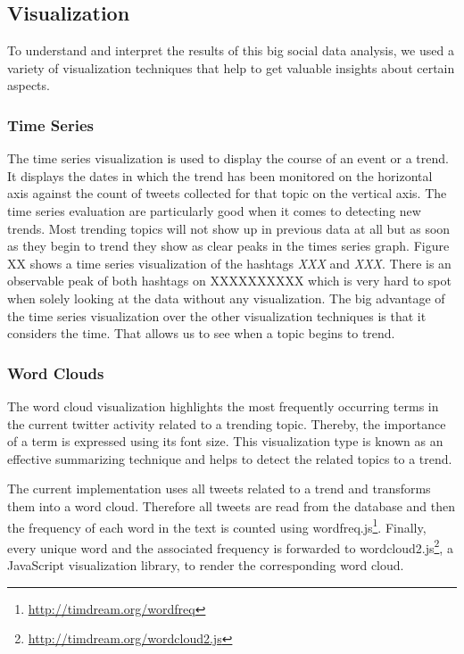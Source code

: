 \subsection{Visualization}
\label{subsec:visualization}
To understand and interpret the results of this big social data analysis, we used a variety of visualization techniques that help to get valuable insights about certain aspects.

\subsubsection{Time Series}
\label{subsubsec:vis-time-series}
The time series visualization is used to display the course of an event or a trend. It displays the dates in which the trend has been monitored on the horizontal axis against the count of tweets collected for that topic on the vertical axis. The time series evaluation are particularly good when it comes to detecting new trends. Most trending topics will not show up in previous data at all but as soon as they begin to trend they show as clear peaks in the times series graph.
Figure XX shows a time series visualization of the hashtags \textit{XXX} and \textit{XXX}. There is an observable peak of both hashtags on XXXXXXXXXX which is very hard to spot when solely looking at the data without any visualization. The big advantage of the time series visualization over the other visualization techniques is that it considers the time. That allows us to see when a topic begins to trend.

\subsubsection{Word Clouds}
\label{subsubsec:vis-word-clouds}
The word cloud visualization highlights the most frequently occurring terms in the current twitter activity related to a trending topic. Thereby, the importance of a term is expressed using its font size. This visualization type is known as an effective summarizing technique and helps to detect the related topics to a trend.

The current implementation uses all tweets related to a trend and transforms them into a word cloud. Therefore all tweets are read from the database and then the frequency of each word in the text is counted using wordfreq.js\footnote{\url{http://timdream.org/wordfreq} \accessednote}. Finally, every unique word and the associated frequency is forwarded to wordcloud2.js\footnote{\url{http://timdream.org/wordcloud2.js} \accessednote}, a JavaScript visualization library, to render the corresponding word cloud.

